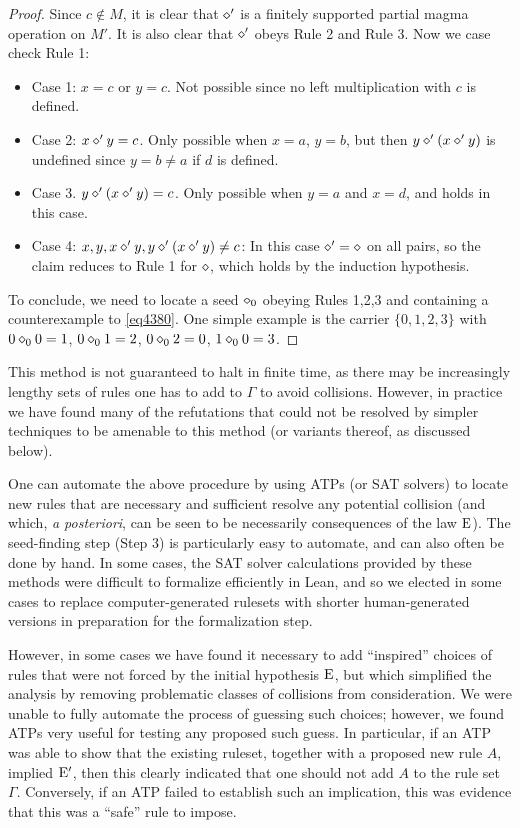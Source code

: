 \begin{proof}
Since $c \not \in M$, it is clear that $\diamond'$ is a finitely supported partial magma operation on $M'$.  It is also clear that $\diamond'$ obeys Rule 2 and Rule 3.   Now we case check Rule 1:
\begin{itemize}
\item Case 1: $x=c$ or $y=c$.  Not possible since no left multiplication with $c$ is defined.
\item Case 2: $x \diamond' y = c$.  Only possible when $x = a$, $y = b$, but then $y \diamond' (x \diamond' y)$ is undefined since $y = b \neq a$ if $d$ is defined.
\item Case 3. $y \diamond' (x \diamond' y) = c$.  Only possible when $y=a$ and $x=d$, and holds in this case.
\item Case 4: $x, y, x \diamond' y, y \diamond' (x \diamond' y) \neq c$: In this case $\diamond'=\diamond$ on all pairs, so the claim reduces to Rule 1 for $\diamond$, which holds by the induction hypothesis.
\end{itemize}
To conclude, we need to locate a seed $\diamond_0$ obeying Rules 1,2,3 and containing a counterexample to \eqref{eq4380}.  One simple example is the carrier $\{0,1,2,3\}$ with $0 \diamond_0 0 = 1$, $0 \diamond_0 1 = 2$, $0 \diamond_0 2 = 0$, $1 \diamond_0 0 = 3$.
\end{proof}

This method is not guaranteed to halt in finite time, as there may be increasingly lengthy sets of rules one has to add to $\Gamma$ to avoid collisions.  However, in practice we have found many of the refutations that could not be resolved by simpler techniques to be amenable to this method (or variants thereof, as discussed below).

One can automate the above procedure by using ATPs (or SAT solvers) to locate new rules that are necessary and sufficient resolve any potential collision (and which, \emph{a posteriori}, can be seen to be necessarily consequences of the law $\mathrm{E}$).  The seed-finding step (Step 3) is particularly easy to automate, and can also often be done by hand.  In some cases, the SAT solver calculations provided by these methods were difficult to formalize efficiently in Lean, and so we elected in some cases to replace computer-generated rulesets with shorter human-generated versions in preparation for the formalization step.

However, in some cases we have found it necessary to add ``inspired'' choices of rules that were not forced by the initial hypothesis $\mathrm{E}$, but which simplified the analysis by removing problematic classes of collisions from consideration.  We were unable to fully automate the process of guessing such choices; however, we found ATPs very useful for testing any proposed such guess.  In particular, if an ATP was able to show that the existing ruleset, together with a proposed new rule $A$, implied ${\mathrm{E}'}$, then this clearly indicated that one should not add $A$ to the rule set $\Gamma$.  Conversely, if an ATP failed to establish such an implication, this was evidence that this was a ``safe'' rule to impose.


